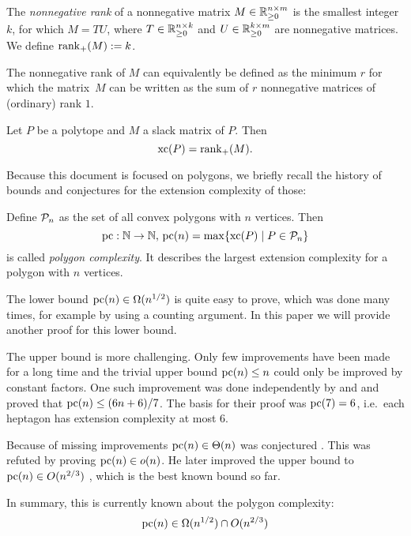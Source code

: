 \begin{definition}
  The \emph{nonnegative rank} of a nonnegative matrix $M \in \R_{\geq 0}^{n \times m}$ is the smallest integer $k$, for which $M = TU$, where $T \in \R_{\geq 0}^{n \times k}$ and $U \in \R_{\geq 0}^{k \times m}$ are nonnegative matrices.
  We define $\rank_+(M) := k$.
\end{definition}

The nonnegative rank of $M$ can equivalently be defined as the minimum $r$ for which the matrix~$M$ can be written as the sum of $r$ nonnegative matrices of (ordinary) rank $1$.

\begin{theorem}
  Let $P$ be a polytope and $M$ a slack matrix of $P$. Then $$\xc(P) = \rank_+(M) .$$
\end{theorem}

Because this document is focused on polygons, we briefly recall the history of bounds and conjectures for the extension complexity of those:

Define $\P_n$ as the set of all convex polygons with $n$ vertices. Then $$\pc:\N \to \N,\,\pc(n) = \max \{\xc(P) \mid P \in \P_n\}$$ is called \emph{polygon complexity}. It describes the largest extension complexity for a polygon with $n$ vertices.

The lower bound $\pc(n) \in \Omega(n^{1/2})$ is quite easy to prove, which was done many times, for example by \textcite{fiorini2012extended} using a counting argument. In this paper we will provide another proof for this lower bound.

The upper bound is more challenging. Only few improvements have been made for a long time and the trivial upper bound $\pc(n) \leq n$ could only be improved by constant factors. One such improvement was done independently by \textcite{shitov2014upper} and \textcite{padrol2014polygons} and proved that $\pc(n) \leq (6n+6)/7$. The basis for their proof was $\pc(7)=6$, i.e.\ each heptagon has extension complexity at most 6.

Because of missing improvements $\pc(n) \in \Theta(n)$ was conjectured \cite{fiorini2012extended}. This was refuted by \textcite{shitov2014sublinear} proving $\pc(n) \in o(n)$. He later improved the upper bound to $\pc(n) \in O(n^{2/3})$ \cite{shitov2020sublinear}, which is the best known bound so far.

In summary, this is currently known about the polygon complexity:
$$\pc(n) \in \Omega(n^{1/2}) \cap O(n^{2/3})$$

